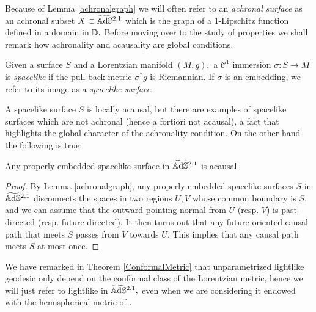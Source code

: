 Because of Lemma \ref{achronalgraph} we will often refer to an \textit{achronal surface} as an achronal subset $X\subset\widetilde{\mathbb{A}\mathrm{d}\mathbb{S}}{}^{2,1}$ which is the graph of a 1-Lipschitz function defined in a domain in $\mathbb{D}.$ Before moving over to the study of properties we shall remark how achronality and acausality are global conditions. 

\begin{definition} Given a surface $S$ and a Lorentzian manifold $(M,g),$ a $\mathcal{C}^1$ immersion $\sigma:S\to M$ is \textit{spacelike} if the pull-back metric $\sigma^*g$ is Riemannian. If $\sigma$ is an embedding, we refer to its image as a \textit{spacelike surface}.
\end{definition}

A spacelike surface $S$ is locally acausal, but there are examples of spacelike surfaces which are not achronal (hence a fortiori not acausal), a fact that highlights the global character of the achronality condition. On the other hand the following is true: 

\begin{lemma}\label{415}
    Any properly embedded spacelike surface in $\widetilde{\mathbb{A}\mathrm{d}\mathbb{S}}{}^{2,1}$ is acausal. 
\end{lemma}
\begin{proof}
    By Lemma \ref{achronalgraph}, any properly embedded spacelike surfaces $S$ in $\widetilde{\mathbb{A}\mathrm{d}\mathbb{S}}{}^{2,1}$ disconnects the spaces in two regions $U,V$ whose common boundary is $S$, and we can assume that the outward pointing normal from $U$ (resp. $V$) is past-directed (resp. future directed). It then turns out that any future oriented causal path that meets $S$ passes from $V$ towards $U$. This implies that any causal path meets $S$ at most once.
\end{proof}

We have remarked in Theorem \ref{ConformalMetric} that unparametrized lightlike geodesic only depend on the conformal class of the Lorentzian metric, hence we will just refer to lightlike in $\widetilde{\mathbb{A}\mathrm{d}\mathbb{S}}{}^{2,1},$ even when we are considering it endowed with the hemispherical metric of . 


